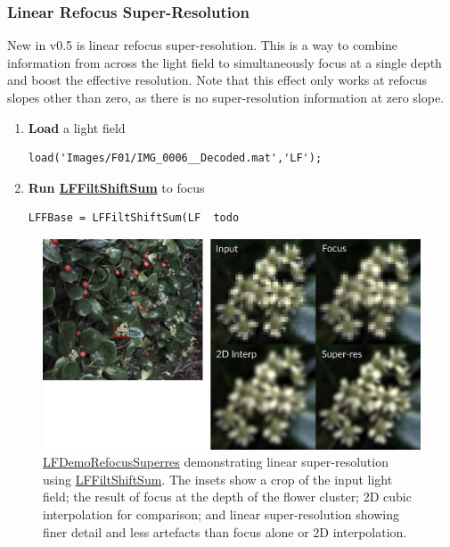 \documentclass[onecolumn]{article}
\newcommand{\CiteFunction}[1]{\hyperlink{#1}{\small #1}}
\begin{document}
\subsubsection{Linear Refocus Super-Resolution}
New in v0.5 is linear refocus super-resolution. This is a way to combine information from across the light field to simultaneously focus at a single depth and boost the effective resolution. Note that this effect only works at refocus slopes other than zero, as there is no super-resolution information at zero slope.

\begin{enumerate}
\item \textbf{Load} a light field
\begin{Verbatim}
load('Images/F01/IMG_0006__Decoded.mat','LF');
\end{Verbatim}
\item \textbf{Run \CiteFunction{LFFiltShiftSum}} to focus 
\begin{Verbatim}
LFFBase = LFFiltShiftSum(LF  todo
\end{Verbatim}

\end{enumerate}


\begin{figure}[tbh]
	\centering
	\includegraphics[width=1\textwidth]{Figs/RefocusSuperRes}
	\caption{\CiteFunction{LFDemoRefocusSuperres} demonstrating linear super-resolution using \CiteFunction{LFFiltShiftSum}. The insets show a crop of the input light field; the result of focus at the depth of the flower cluster; 2D cubic interpolation for comparison; and linear super-resolution showing finer detail and less artefacts than focus alone or 2D interpolation.}
	\label{fig_RefocusSuperResolution}
\end{figure}


\end{document}
